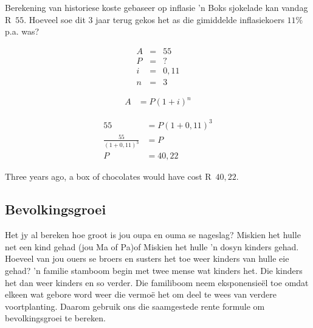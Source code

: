 \begin{wex}{Berekening van historiese koste gebaseer op inflasie}
    {'n Boks sjokelade kan vandag R~$55$. Hoeveel soe dit $3$ jaar terug gekos het as die gimiddelde inflasiekoers $11\%$p.a. was?}{
    
    \begin{eqnarray*}
	A &=& 55\\
	P &=& ?\\
	i &=& 0,11\\
	n &=& 3
    \end{eqnarray*}

    \begin{align*}
	A &= P(1 + i)^n
    \end{align*}

    \begin{align*}
	55 &= P(1 + 0,11)^3\\
	\frac{55}{(1 + 0,11)^3} &= P\\
	P  &= 40,22
    \end{align*}

    Three years ago, a box of chocolates would have cost R~$40,22$.
    }
\end{wex}


\subsection{Bevolkingsgroei}

Het jy al bereken hoe groot is jou oupa en ouma se nageslag? Miskien het hulle net een kind gehad (jou Ma of Pa)of Miskien het hulle 'n dosyn kinders gehad. Hoeveel van jou ouers se broers en susters het toe weer kinders van hulle eie gehad? 'n familie stamboom begin met twee mense wat kinders het. Die kinders het dan weer kinders en so verder. Die familiboom neem eksponensie\"el toe omdat elkeen wat gebore word weer die vermo\"e het om deel te wees van verdere voortplanting. Daarom gebruik ons die saamgestede rente formule om bevolkingsgroei te bereken.


